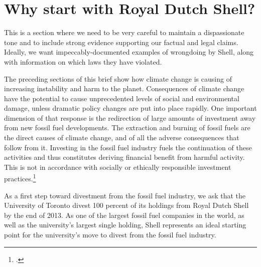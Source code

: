 


		\singlespacing
		\section{Why start with Royal Dutch Shell?}
		\label{sec:Shell}
		\doublespacing






\begin{vcom}
This is a section where we need to be very careful to maintain a dispassionate tone and to include strong evidence supporting our factual and legal claims. Ideally, we want impeccably-documented examples of wrongdoing by Shell, along with information on which laws they have violated.
\end{vcom}



The preceding sections of this brief show how climate change is causing of increasing instability and harm to the planet.
Consequences of climate change have the potential to cause unprecedented levels of social and environmental damage, unless dramatic policy changes are put into place rapidly. 
One important dimension of that response is the redirection of large amounts of investment away from new fossil fuel developments.
The extraction and burning of fossil fuels are the direct causes of climate change, and of all the adverse consequences that follow from it. 
Investing in the fossil fuel industry fuels the continuation of these activities and thus constitutes deriving financial benefit from harmful activity.
This is not in accordance with socially or ethically responsible investment practices.\footcite[][]{Richardson_2008}



As a first step toward divestment from the fossil fuel industry, we ask that the University of Toronto divest 100 percent of its holdings from Royal Dutch Shell by the end of 2013. 
As one of the largest fossil fuel companies in the world, as well as the university's largest single holding, Shell represents an ideal starting point for the university's move to divest from the fossil fuel industry.
		


